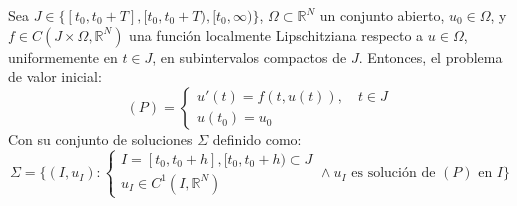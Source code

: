 \begin{definición}
    Sea $J \in \{ [t_0, t_0 + T], [t_0, t_0 + T), [t_0, \infty) \}$, $\Omega \subset \mathbb{R}^N$ un conjunto abierto, $u_0 \in \Omega$, y $f \in C(J \times \Omega, \mathbb{R}^N)$ una función localmente Lipschitziana respecto a $u \in \Omega$, uniformemente en $t \in J$, en subintervalos compactos de $J$. Entonces, el problema de valor inicial:
    \[
        (P) =
        \begin{cases}
            u'(t) = f(t, u(t)), \quad t \in J \\
            u(t_0) = u_0
        \end{cases}
    \]
    Con su conjunto de soluciones $\Sigma$ definido como:
    \[
        \Sigma = \{
            (I, u_I) : 
            \begin{cases}
                I = [t_0, t_0 + h], [t_0, t_0 + h) \subset J \\
                u_I \in C^1(I, \mathbb{R}^N)
            \end{cases}
            \wedge u_I \text{ es solución de } (P) \text{ en } I
        \}
    \]
\end{definición}

